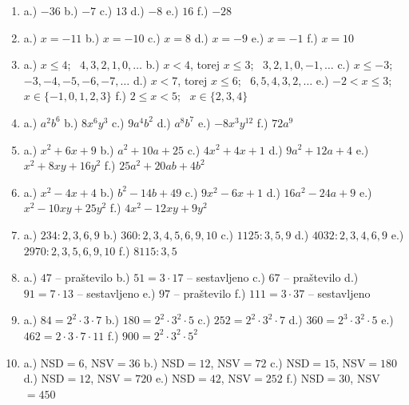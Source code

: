 \documentclass[a4paper,12pt]{letter}
\begin{document}
\begin{enumerate}
\item a.) $-36$ \quad b.) $-7$ \quad c.) $13$ \quad d.) $-8$ \quad e.) $16$ \quad f.) $-28$

\item a.) $x=-11$ \quad b.) $x=-10$ \quad c.) $x=8$ \quad d.) $x=-9$ \quad e.) $x=-1$ \quad f.) $x=10$

\item a.) $x\le 4$; \ $4,3,2,1,0,\dots$ \quad
      b.) $x<4$, torej $x\le 3$; \ $3,2,1,0,-1,\dots$ \quad
      c.) $x\le -3$; \ $-3,-4,-5,-6,-7,\dots$ \quad
      d.) $x<7$, torej $x\le 6$; \ $6,5,4,3,2,\dots$ \quad
      e.) $-2<x\le 3$; \ $x\in\{-1,0,1,2,3\}$ \quad
      f.) $2\le x<5$; \ $x\in\{2,3,4\}$

\item a.) $a^2b^6$ \quad b.) $8x^6y^3$ \quad c.) $9a^4b^2$ \quad d.) $a^8b^7$ \quad
      e.) $-8x^3y^{12}$ \quad f.) $72a^9$

\item a.) $x^2+6x+9$ \quad b.) $a^2+10a+25$ \quad c.) $4x^2+4x+1$ \quad
      d.) $9a^2+12a+4$ \quad e.) $x^2+8xy+16y^2$ \quad f.) $25a^2+20ab+4b^2$

\item a.) $x^2-4x+4$ \quad b.) $b^2-14b+49$ \quad c.) $9x^2-6x+1$ \quad
      d.) $16a^2-24a+9$ \quad e.) $x^2-10xy+25y^2$ \quad f.) $4x^2-12xy+9y^2$

\item a.) $234\colon 2,3,6,9$ \quad b.) $360\colon 2,3,4,5,6,9,10$ \quad c.) $1125\colon 3,5,9$ \quad
      d.) $4032\colon 2,3,4,6,9$ \quad e.) $2970\colon 2,3,5,6,9,10$ \quad f.) $8115\colon 3,5$

\item a.) $47$ -- pra\v{s}tevilo \quad b.) $51=3\cdot17$ -- sestavljeno \quad
      c.) $67$ -- pra\v{s}tevilo \quad d.) $91=7\cdot13$ -- sestavljeno \quad
      e.) $97$ -- pra\v{s}tevilo \quad f.) $111=3\cdot37$ -- sestavljeno

\item a.) $84=2^2\cdot3\cdot7$ \quad b.) $180=2^2\cdot3^2\cdot5$ \quad c.) $252=2^2\cdot3^2\cdot7$ \quad
      d.) $360=2^3\cdot3^2\cdot5$ \quad e.) $462=2\cdot3\cdot7\cdot11$ \quad f.) $900=2^2\cdot3^2\cdot5^2$

\item a.) NSD$=6$, NSV$=36$ \quad b.) NSD$=12$, NSV$=72$ \quad c.) NSD$=15$, NSV$=180$ \quad
      d.) NSD$=12$, NSV$=720$ \quad e.) NSD$=42$, NSV$=252$ \quad f.) NSD$=30$, NSV$=450$


\end{enumerate}
\end{document}
